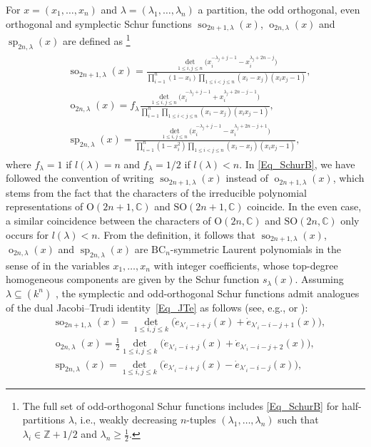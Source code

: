 \documentclass[pdftex]{sigma}
\numberwithin{equation}{section}
\renewcommand{\leq}{\leqslant}
\renewcommand{\geq}{\geqslant}
\DeclareMathOperator{\symp}{sp}
\DeclareMathOperator{\so}{so}
\DeclareMathOperator{\oeven}{o}
\newcommand{\la}{\lambda}
\begin{document}
For $x=(x_1,\dots,x_n)$ and $\la=(\la_1,\dots,\la_n)$ a partition,
the odd orthogonal, even orthogonal and symplectic Schur functions
$\so_{2n+1,\la}(x)$, $\oeven_{2n,\la}(x)$ and $\symp_{2n,\la}(x)$
are defined as \cite{Littlewood50}\footnote{The full set of
odd-orthogonal Schur functions includes \eqref{Eq_SchurB} for
half-partitions $\la$, i.e., weakly decreasing $n$-tuples
$(\la_1,\dots,\la_n)$ such that $\la_i\in\mathbb{Z}+1/2$ and
$\la_n\geq\frac{1}{2}$.}
\begin{align}\label{Eq_SchurB}
\begin{split}
&\so_{2n+1,\la}(x)=\frac{\det_{1\leq i,j\leq n}
\bigl( x_i^{-\la_j+j-1}-x_i^{\la_j+2n-j} \bigr)}
{\prod_{i=1}^n (1-x_i)\prod_{1\leq i<j\leq n}(x_i-x_j)(x_ix_j-1)}, \\
&\oeven_{2n,\la}(x)=f_{\la} \frac{\det_{1\leq i,j\leq n}
\bigl( x_i^{-\la_j+j-1}+x_i^{\la_j+2n-j-1} \bigr)}
{\prod_{i=1}^n \prod_{1\leq i<j\leq n}(x_i-x_j)(x_ix_j-1)}, \\
&\symp_{2n,\la}(x)=\frac{\det_{1\leq i,j\leq n}
\bigl( x_i^{-\la_j+j-1}-x_i^{\la_j+2n-j+1} \bigr)}
{\prod_{i=1}^n (1-x_i^2)\prod_{1\leq i<j\leq n}(x_i-x_j)(x_ix_j-1)},
\end{split}
\end{align}
where $f_{\la}=1$ if $l(\la)=n$ and $f_{\la}=1/2$ if $l(\la)<n$.
In \eqref{Eq_SchurB}, we have followed the convention of writing
$\so_{2n+1,\la}(x)$ instead of $\oeven_{2n+1,\la}(x)$, which stems
from the fact that the characters of the irreducible polynomial
representations of $\mathrm{O}(2n+1,\mathbb{C})$ and
$\mathrm{SO}(2n+1,\mathbb{C})$ coincide.
In the even case, a similar coincidence between the characters of
$\mathrm{O}(2n,\mathbb{C})$ and $\mathrm{SO}(2n,\mathbb{C})$
only occurs for $l(\la)<n$.
From the definition, it follows that $\so_{2n+1,\la}(x)$,
$\oeven_{2n,\la}(x)$ and $\symp_{2n,\la}(x)$ are
$\mathrm{BC}_n$-symmetric Laurent polynomials
in the sense of \cite{RW21} in the variables $x_1,\dots,x_n$ with
integer coefficients, whose top-degree homogeneous components are
given by the Schur function $s_{\la}(x)$.
Assuming $\la\subseteq (k^n)$ , the symplectic and
odd-orthogonal Schur functions admit analogues of the dual
Jacobi--Trudi identity~\eqref{Eq_JTe} as follows
(see, e.g., \cite[p.~123]{Stembridge91} or
\cite[equations~(3.10) and~(3.27)]{FK97}):
\begin{align*}
&\so_{2n+1,\la}(x)=\det_{1\leq i,j\leq k}\bigl(
\dot{e}_{\la'_i-i+j}(x)+\dot{e}_{\la'_i-i-j+1}(x)\bigr), \\
&\oeven_{2n,\la}(x)=\frac{1}{2} \det_{1\leq i,j\leq k}\bigl(
\dot{e}_{\la'_i-i+j}(x)+\dot{e}_{\la'_i-i-j+2}(x)\bigr), \\
&\symp_{2n,\la}(x)=\det_{1\leq i,j\leq k}\bigl(
\dot{e}_{\la'_i-i+j}(x)-\dot{e}_{\la'_i-i-j}(x)\bigr),
\end{align*}
\end{document}

